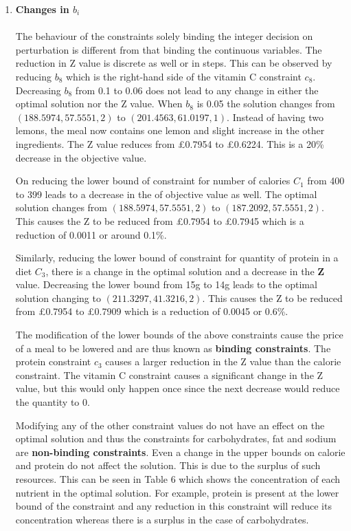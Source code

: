 \documentclass[
]{article}
\begin{document}
\begin{enumerate}
	\item \textbf{Changes in \(b_i\)}\\
	      \\
	      The behaviour of the constraints solely binding the integer decision on perturbation is different from that binding the continuous variables.
	      The reduction in Z value is discrete as well or in steps. This can be observed by reducing $b_8$ which is the right-hand side of the vitamin C constraint $c_8$.
	      Decreasing $b_8$ from 0.1 to 0.06 does not lead to any change in either the optimal solution nor the Z value. When $b_8$ is 0.05 the solution changes from $\left(188.5974, 57.5551, 2\right)$ to $\left(201.4563, 61.0197, 1\right)$.
	      Instead of having two lemons, the meal now contains one lemon and slight increase in the other ingredients. The Z value reduces from \pounds 0.7954 to \pounds 0.6224. This is a 20\% decrease in the objective value.
	      	      
	      On reducing the lower bound of constraint for number of calories \(C_1\) from 400 to 399 leads to a decrease in the of objective value as well.
	      The optimal solution changes from $\left(188.5974, 57.5551, 2\right)$ to $\left(187.2092, 57.5551, 2\right)$. This causes the Z to be reduced from \pounds 0.7954 to \pounds 0.7945 which is a reduction of 0.0011 or around 0.1\%.
	      	          
	      Similarly, reducing the lower bound of constraint for quantity of protein in a diet \(C_3\), there is a change in the optimal solution and a decrease in the \textbf{Z} value.    
	      Decreasing the lower bound from 15g to 14g leads to the optimal solution changing to $\left(211.3297, 41.3216, 2\right)$.
	      This causes the Z to be reduced from \pounds 0.7954 to \pounds 0.7909 which is a reduction of 0.0045 or 0.6\%. 
	      	          
	      The modification of the lower bounds of the above constraints cause the price of a meal to be lowered and are thus known as \textbf{binding constraints}.
	      The protein constraint $c_3$ causes a larger reduction in the Z value than the calorie constraint. The vitamin C constraint causes a significant change in the Z value, but this would only happen once since the next decrease would reduce the quantity to 0.
	      	      
	      Modifying any of the other constraint values do not have an effect on the optimal solution and thus the constraints for carbohydrates, fat and sodium are \textbf{non-binding constraints}. 
	      Even a change in the upper bounds on calorie and protein do not affect the solution.
	      This is due to the surplus of such resources. This can be seen in Table 6 which shows the concentration of each nutrient in the optimal solution. 
	      For example, protein is present at the lower bound of the constraint and any reduction in this constraint will reduce its concentration whereas there is a surplus in the case of carbohydrates.
	      	      

\end{enumerate}
\end{document}
